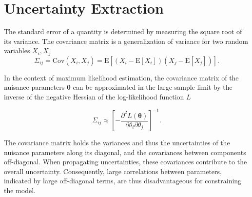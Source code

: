 \section{Uncertainty Extraction}
The standard error of a quantity is determined by measuring the square root of its variance. The covariance matrix is a generalization of variance for two random variables $X_i, X_j$
\begin{equation}
    \Sigma_{ij}=\text{Cov}(X_i, X_j) = \text{E}[(X_i - \text{E}[X_i])(X_j - \text{E}[X_j])].
\end{equation}

In the context of maximum likelihood estimation, the covariance matrix of the nuisance parameters \( \bm{\theta} \) can be approximated in the large sample limit by the inverse of the negative Hessian of the log-likelihood function $L$

\begin{equation}
    \Sigma_{ij} \approx \left[ -\frac{\partial^2 L(\bm{\theta})}{\partial \theta_i \partial \theta_j} \right]^{-1}.
\end{equation}

The covariance matrix holds the variances and thus the uncertainties of the nuisance parameters along its diagonal, and the covariances between components off-diagonal. When propagating uncertainties, these covariances contribute to the overall uncertainty. Consequently, large correlations between parameters, indicated by large off-diagonal terms, are thus disadvantageous for constraining the model.
